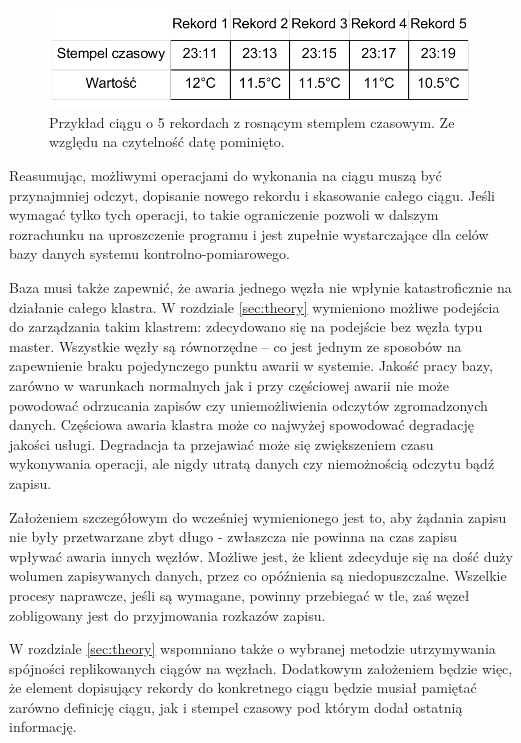 \documentclass[a4paper,polish,12pt,twoside]{article}
\begin{document}
	\begin{figure}[h]
		\centering \includegraphics[width=12cm]{a_series}
		\caption[Przykład ciągu o 5 rekordach z rosnącym stemplem czasowym]{Przykład ciągu o 5 rekordach z rosnącym stemplem czasowym. Ze względu na czytelność datę pominięto.}
		\label{fig:a_series}
	\end{figure}

Reasumując, możliwymi operacjami do wykonania na ciągu muszą być przynajmniej odczyt, dopisanie nowego rekordu i skasowanie całego ciągu. Jeśli wymagać tylko tych operacji, to takie ograniczenie pozwoli w dalszym rozrachunku na uproszczenie programu i jest zupełnie wystarczające dla celów bazy danych systemu kontrolno-pomiarowego. 

Baza musi także zapewnić, że awaria jednego węzła nie wpłynie katastroficznie na działanie całego klastra. W rozdziale \ref{sec:theory} wymieniono możliwe podejścia do zarządzania takim klastrem: zdecydowano się na podejście bez węzła typu master. Wszystkie węzły są równorzędne – co jest jednym ze sposobów na zapewnienie braku pojedynczego punktu awarii w systemie. Jakość pracy bazy, zarówno w warunkach normalnych jak i przy częściowej awarii nie może powodować odrzucania zapisów czy uniemożliwienia odczytów zgromadzonych danych. Częściowa awaria klastra może co najwyżej spowodować degradację jakości usługi. Degradacja ta przejawiać może się zwiększeniem czasu wykonywania operacji, ale nigdy utratą danych czy niemożnością odczytu bądź zapisu.

Założeniem szczegółowym do wcześniej wymienionego jest to, aby żądania zapisu nie były przetwarzane zbyt długo - zwłaszcza nie powinna na czas zapisu wpływać awaria innych węzłów. Możliwe jest, że klient zdecyduje się na dość duży wolumen zapisywanych danych, przez co opóźnienia są niedopuszczalne. Wszelkie procesy naprawcze, jeśli są wymagane, powinny przebiegać w tle, zaś węzeł zobligowany jest do przyjmowania rozkazów zapisu.

W rozdziale \ref{sec:theory} wspomniano także o wybranej metodzie utrzymywania spójności replikowanych ciągów na węzłach. Dodatkowym założeniem będzie więc, że element dopisujący rekordy do konkretnego ciągu będzie musiał pamiętać zarówno definicję ciągu, jak i stempel czasowy pod którym dodał ostatnią informację. 
\end{document}
